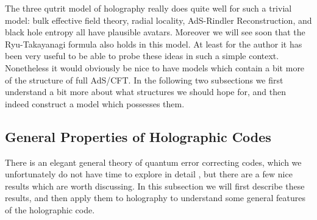 \documentclass[toc]{PoS}
\begin{document}
The three qutrit model of holography really does quite well for such a trivial model: bulk effective field theory, radial locality, AdS-Rindler Reconstruction, and black hole entropy all have plausible avatars.  Moreover we will see soon that the Ryu-Takayanagi formula also holds in this model.  At least for the author it has been very useful to be able to probe these ideas in such a simple context.  Nonetheless it would obviously be nice to have models which contain a bit more of the structure of full AdS/CFT.  In the following two subsections we first understand a bit more about what structures we should hope for, and then indeed construct a model which possesses them.  

\subsection{General Properties of Holographic Codes}
There is an elegant general theory of quantum error correcting codes, which we unfortunately do not have time to explore in detail \cite{Gottesman:1997zz,nielsen2002quantum}, but there are a few nice results which are worth discussing.  In this subsection we will first describe these results, and then apply them to holography to understand some general features of the holographic code.  
\end{document}
